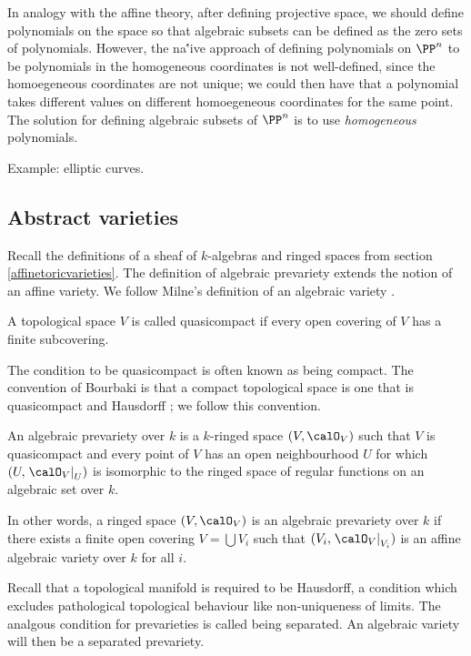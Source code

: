 In analogy with the affine theory, after defining projective space, we should define polynomials on the space so that algebraic subsets can be defined as the zero sets of polynomials.
However, the na\''ive approach of defining polynomials on $\PP^n$ to be polynomials in the homogeneous coordinates is not well-defined, since the homoegeneous coordinates are not unique;
we could then have that a polynomial takes different values on different homoegeneous coordinates for the same point.
The solution for defining algebraic subsets of $\PP^n$ is to use \emph{homogeneous} polynomials.

Example: elliptic curves.





\subsection{Abstract varieties}
Recall the definitions of a sheaf of $k$-algebras and ringed spaces from section \ref{affinetoricvarieties}.
The definition of algebraic prevariety extends the notion of an affine variety.
We follow Milne's definition of an algebraic variety \cite{Milne13}.

\begin{definition}
A topological space $V$ is called quasicompact if every open covering of $V$ has a finite subcovering.
\end{definition}

The condition to be quasicompact is often known as being compact.
The convention of Bourbaki is that a compact topological space is one that is quasicompact and Hausdorff \cite[\S 2 g.]{Milne13}; we follow this convention.

\begin{definition}
An algebraic prevariety over $k$ is a $k$-ringed space $(V, \calO_V)$ such that $V$ is quasicompact and every point of $V$ has an open neighbourhood $U$ for which $(U, \left. \calO_V \right|_U)$ is isomorphic to the ringed space of regular functions on an algebraic set over $k$.
\end{definition}

In other words, a ringed space $(V, \calO_V)$ is an algebraic prevariety over $k$ if there exists a finite open covering $V = \bigcup V_i$ such that $(V_i, \left. \calO_V \right|_{V_i})$ is an affine algebraic variety over $k$ for all $i$.

Recall that a topological manifold is required to be Hausdorff, a condition which excludes pathological topological behaviour like non-uniqueness of limits.
The analgous condition for prevarieties is called being separated.
An algebraic variety will then be a separated prevariety.

